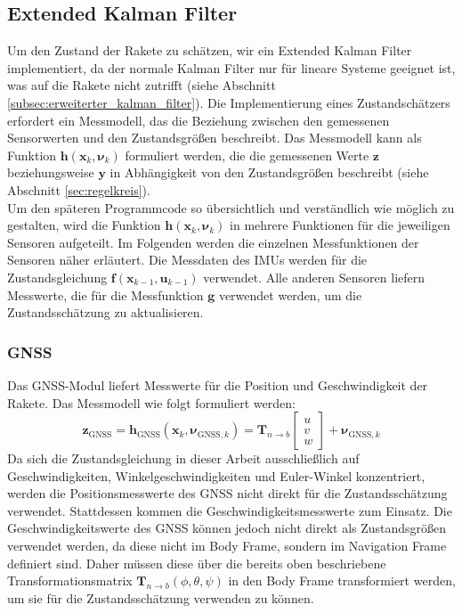 \subsection{Extended Kalman Filter}
\label{subsec:extendedkalmanfilter}
Um den Zustand der Rakete zu schätzen, wir ein Extended Kalman Filter implementiert, da der normale Kalman Filter nur für lineare Systeme geeignet ist, was auf die Rakete nicht zutrifft (siehe Abschnitt \ref{subsec:erweiterter_kalman_filter}).
Die Implementierung eines Zustandschätzers erfordert ein Messmodell, das die Beziehung zwischen den gemessenen Sensorwerten und den Zustandsgrößen beschreibt. Das Messmodell kann als Funktion $\mathbf{h}(\mathbf{x}_k, \boldsymbol{\nu}_k)$ formuliert werden, die die gemessenen Werte $\mathbf{z}$ beziehungsweise $\mathbf{y}$ in Abhängigkeit von den Zustandsgrößen beschreibt (siehe Abschnitt \ref{sec:regelkreis}). 
\\
Um den späteren Programmcode so übersichtlich und verständlich wie möglich zu gestalten, wird die Funktion $\mathbf{h}(\mathbf{x}_k, \boldsymbol{\nu}_k)$ in mehrere Funktionen für die jeweiligen Sensoren aufgeteilt.
Im Folgenden werden die einzelnen Messfunktionen der Sensoren näher erläutert.
Die Messdaten des IMUs werden für die Zustandsgleichung $\mathbf{f}(\mathbf{x}_{k-1}, \mathbf{u}_{k-1})$ verwendet. Alle anderen Sensoren liefern Messwerte, die für die Messfunktion $\mathbf{g}$ verwendet werden, um die Zustandsschätzung zu aktualisieren.
\subsubsection{GNSS}
Das GNSS-Modul liefert Messwerte für die Position und Geschwindigkeit der Rakete. Das Messmodell wie folgt formuliert werden:
\begin{equation}
\mathbf{z}_{\mathrm{GNSS}} = \mathbf{h}_{\mathrm{GNSS}}(\mathbf{x}_k, \boldsymbol{\nu}_{\mathrm{GNSS},k}) = 
\mathbf{T}_{n \to b}
\begin{bmatrix}u \\
v \\
w
\end{bmatrix} + \boldsymbol{\nu}_{\mathrm{GNSS},k}
\end{equation}
Da sich die Zustandsgleichung in dieser Arbeit ausschließlich auf Geschwindigkeiten, Winkelgeschwindigkeiten und Euler-Winkel konzentriert, werden die Positionsmesswerte des GNSS nicht direkt für die Zustandsschätzung verwendet. Stattdessen kommen die Geschwindigkeitsmesswerte zum Einsatz. Die Geschwindigkeitswerte des GNSS können jedoch nicht direkt als Zustandsgrößen verwendet werden, da diese nicht im Body Frame, sondern im Navigation Frame definiert sind. Daher müssen diese über die bereits oben beschriebene Transformationsmatrix $\mathbf{T}_{n \to b}(\phi, \theta, \psi)$ in den Body Frame transformiert werden, um sie für die Zustandsschätzung verwenden zu können.

